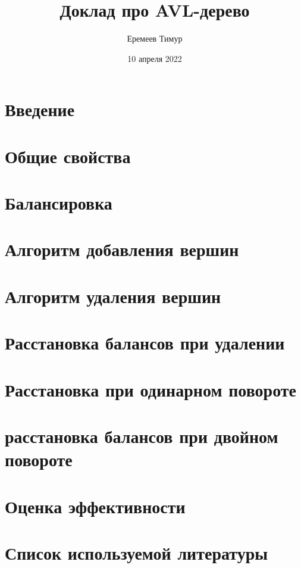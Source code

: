 \documentclass[a4paper, 12pt]{article}
\begin{document}
    \title{Доклад про AVL-дерево}
    \author{Еремеев Тимур}
    \date{10 апреля 2022}

    \maketitle

    \tableofcontents

    \section*{Введение}
    

    \section*{Общие свойства}
    

    \section*{Балансировка}
    

    \section*{Алгоритм добавления вершин}
    

    \section*{Алгоритм удаления вершин}
    

    \section*{Расстановка балансов при удалении}
    

    \section*{Расстановка при одинарном повороте}
    

    \section*{расстановка балансов при двойном повороте}
    

    \section*{Оценка эффективности}
    

    \section{Список используемой литературы}
    
\end{document}
